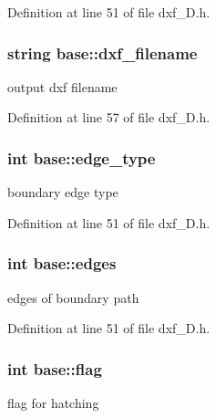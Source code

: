 Definition at line 51 of file dxf\-\_\-D.\-h.

\hypertarget{classbase_aa3e204024e466de567044e1e992d39db}{
\subsubsection[{dxf\-\_\-filename}]{\setlength{\rightskip}{0pt plus 5cm}string base\-::dxf\-\_\-filename\hspace{0.3cm}{\ttfamily [protected]}}}\label{classbase_aa3e204024e466de567044e1e992d39db}
output dxf filename 

Definition at line 57 of file dxf\-\_\-D.\-h.

\hypertarget{classbase_a65b11e6006cd45d381b31d6fbaa82c67}{
\subsubsection[{edge\-\_\-type}]{\setlength{\rightskip}{0pt plus 5cm}int base\-::edge\-\_\-type\hspace{0.3cm}{\ttfamily [protected]}}}\label{classbase_a65b11e6006cd45d381b31d6fbaa82c67}
boundary edge type 

Definition at line 51 of file dxf\-\_\-D.\-h.

\hypertarget{classbase_af5da8689af8a9b1bf5376873bbece1ae}{
\subsubsection[{edges}]{\setlength{\rightskip}{0pt plus 5cm}int base\-::edges\hspace{0.3cm}{\ttfamily [protected]}}}\label{classbase_af5da8689af8a9b1bf5376873bbece1ae}
edges of boundary path 

Definition at line 51 of file dxf\-\_\-D.\-h.

\hypertarget{classbase_ac16efe03b1a537989afd2a1eebdde0e9}{
\subsubsection[{flag}]{\setlength{\rightskip}{0pt plus 5cm}int base\-::flag\hspace{0.3cm}{\ttfamily [protected]}}}\label{classbase_ac16efe03b1a537989afd2a1eebdde0e9}
flag for hatching 

